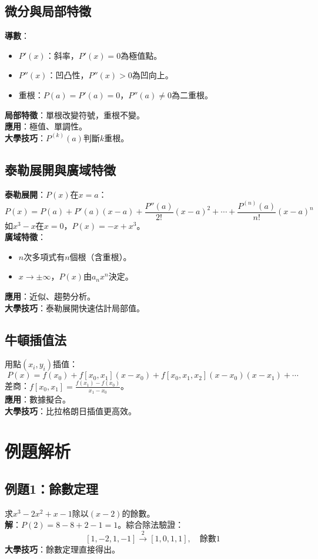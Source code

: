 \subsection{微分與局部特徵}
\textbf{導數}：
\begin{itemize}
    \item $P'(x)$：斜率，$P'(x) = 0$為極值點。
    \item $P''(x)$：凹凸性，$P''(x) > 0$為凹向上。
    \item 重根：$P(a) = P'(a) = 0$，$P''(a) \neq 0$為二重根。
\end{itemize}
\textbf{局部特徵}：單根改變符號，重根不變。\\
\textbf{應用}：極值、單調性。\\
\textbf{大學技巧}：$P^{(k)}(a)$判斷$k$重根。

\subsection{泰勒展開與廣域特徵}
\textbf{泰勒展開}：$P(x)$在$x = a$：
\[
P(x) = P(a) + P'(a)(x - a) + \frac{P''(a)}{2!}(x - a)^2 + \cdots + \frac{P^{(n)}(a)}{n!}(x - a)^n
\]
如$x^3 - x$在$x = 0$，$P(x) = -x + x^3$。\\
\textbf{廣域特徵}：
\begin{itemize}
    \item $n$次多項式有$n$個根（含重根）。
    \item $x \to \pm \infty$，$P(x)$由$a_n x^n$決定。
\end{itemize}
\textbf{應用}：近似、趨勢分析。\\
\textbf{大學技巧}：泰勒展開快速估計局部值。

\subsection{牛頓插值法}
用點$(x_i, y_i)$插值：
\[
P(x) = f(x_0) + f[x_0, x_1](x - x_0) + f[x_0, x_1, x_2](x - x_0)(x - x_1) + \cdots
\]
差商：$f[x_0, x_1] = \frac{f(x_1) - f(x_0)}{x_1 - x_0}$。\\
\textbf{應用}：數據擬合。\\
\textbf{大學技巧}：比拉格朗日插值更高效。

\section{例題解析}

\subsection{例題1：餘數定理}
求$x^3 - 2x^2 + x - 1$除以$(x - 2)$的餘數。\\
\textbf{解}：$P(2) = 8 - 8 + 2 - 1 = 1$。綜合除法驗證：
\[
[1, -2, 1, -1] \xrightarrow{2} [1, 0, 1, 1], \quad \text{餘數} 1
\]
\textbf{大學技巧}：餘數定理直接得出。

